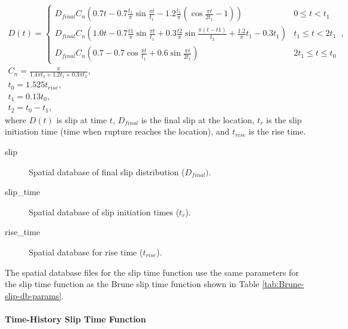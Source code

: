 \begin{gather}
D(t)=\left\{ \begin{array}{cc}
D_{\mathit{final}}C_{n}\left(0.7t-0.7\frac{t_{1}}{\pi}\sin\frac{\pi t}{t_{1}}-1.2\frac{t_{1}}{\pi}\left(\cos\frac{\pi t}{2t_{1}}-1\right)\right) & 0\leq t<t_{1}\\
D_{\mathit{final}}C_{n}\left(1.0t-0.7\frac{t1}{\pi}\sin\frac{\pi t}{t_{1}}+0.3\frac{t2}{\pi}\sin\frac{\pi(t-t1)}{t_{2}}+\frac{1.2}{\pi}t_{1}-0.3t_{1}\right) & t_{1}\leq t<2t_{1}\\
D_{\mathit{final}}C_{n}\left(0.7-0.7\cos\frac{\pi t}{t_{1}}+0.6\sin\frac{\pi t}{2t_{1}}\right) & 2t_{1}\leq t\leq t_{0}
\end{array}\right.\,,\\
C_{n}=\frac{\pi}{1.4\pi t_{1}+1.2t_{1}+0.3\pi t_{2}},\\
t_{0}=1.525t_{\mathit{rise}},\\
t_{1}=0.13t_{0},\\
t_{2}=t_{0}-t_{1},
\end{gather}
where $D(t)$ is slip at time $t$, $D_{final}$ is the final slip
at the location, $t_{r}$ is the slip initiation time (time when rupture
reaches the location), and $t_{\mathit{rise}}$ is the rise time.
\begin{description}
\item [{slip}] Spatial database of final slip distribution ($D_{final})$.
\item [{slip\_time}] Spatial database of slip initiation times ($t_{r}$).
\item [{rise\_time}] Spatial database for rise time ($t_{\mathit{rise}}$).
\end{description}
The spatial database files for the slip time function use the same
parameters for the slip time function as the Brune slip time function
shown in Table \ref{tab:Brune-slip-db-params}.


\paragraph{Time-History Slip Time Function}

